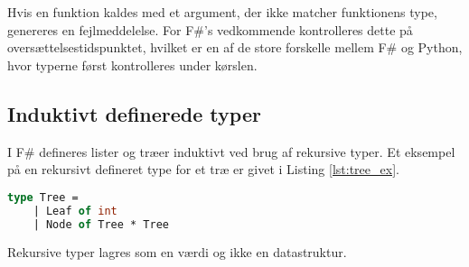 


Hvis en funktion kaldes med et argument, der ikke matcher funktionens type, genereres en fejlmeddelelse. For F\#'s vedkommende kontrolleres dette på oversættelsestidspunktet, hvilket er en af de store forskelle mellem F\# og Python, hvor typerne først kontrolleres under kørslen.

\subsection{Induktivt definerede typer}
I F\# defineres lister og træer induktivt ved brug af rekursive typer. Et eksempel på en rekursivt defineret type for et træ er givet i Listing \ref{lst:tree_ex}.

\begin{lstlisting}[language={FSharp}, label={lst:tree_ex}, caption={Eksempel på en rekursivt defineret type for et træ i F\#}]
type Tree = 
    | Leaf of int
    | Node of Tree * Tree
\end{lstlisting}

Rekursive typer lagres som en værdi og ikke en datastruktur.



